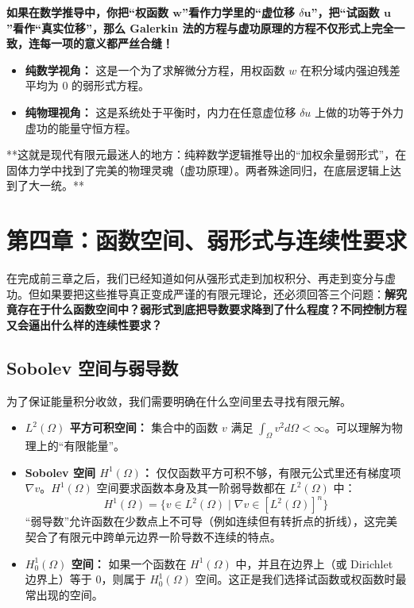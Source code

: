 \documentclass[11pt, a4paper, UTF8]{ctexart}
\begin{document}
\textbf{如果在数学推导中，你把“权函数 $\bm{w}$”看作力学里的“虚位移 $\delta \bm{u}$”，把“试函数 $\bm{u}$”看作“真实位移”，那么 Galerkin 法的方程与虚功原理的方程不仅形式上完全一致，连每一项的意义都严丝合缝！}
\begin{itemize}
    \item \textbf{纯数学视角：} 这是一个为了求解微分方程，用权函数 $w$ 在积分域内强迫残差平均为 0 的弱形式方程。
    \item \textbf{纯物理视角：} 这是系统处于平衡时，内力在任意虚位移 $\delta u$ 上做的功等于外力虚功的能量守恒方程。
\end{itemize}

**这就是现代有限元最迷人的地方：纯粹数学逻辑推导出的“加权余量弱形式”，在固体力学中找到了完美的物理灵魂（虚功原理）。两者殊途同归，在底层逻辑上达到了大一统。**

\section{第四章：函数空间、弱形式与连续性要求}
在完成前三章之后，我们已经知道如何从强形式走到加权积分、再走到变分与虚功。但如果要把这些推导真正变成严谨的有限元理论，还必须回答三个问题：\textbf{解究竟存在于什么函数空间中？弱形式到底把导数要求降到了什么程度？不同控制方程又会逼出什么样的连续性要求？}

\subsection{Sobolev 空间与弱导数}
为了保证能量积分收敛，我们需要明确在什么空间里去寻找有限元解。
\begin{itemize}
    \item \textbf{$L^2(\Omega)$ 平方可积空间：}
    集合中的函数 $v$ 满足 $\int_{\Omega} v^2 d\Omega < \infty$。可以理解为物理上的“有限能量”。
    \item \textbf{Sobolev 空间 $H^1(\Omega)$：}
    仅仅函数平方可积不够，有限元公式里还有梯度项 $\nabla v$。$H^1(\Omega)$ 空间要求函数本身及其一阶弱导数都在 $L^2(\Omega)$ 中：
    \[
    H^1(\Omega) = \{ v \in L^2(\Omega) \mid \nabla v \in [L^2(\Omega)]^n \}
    \]
    “弱导数”允许函数在少数点上不可导（例如连续但有转折点的折线），这完美契合了有限元中跨单元边界一阶导数不连续的特点。
    \item \textbf{$H^1_0(\Omega)$ 空间：}
    如果一个函数在 $H^1(\Omega)$ 中，并且在边界上（或 Dirichlet 边界上）等于 0，则属于 $H^1_0(\Omega)$ 空间。这正是我们选择试函数或权函数时最常出现的空间。
\end{itemize}
\end{document}

